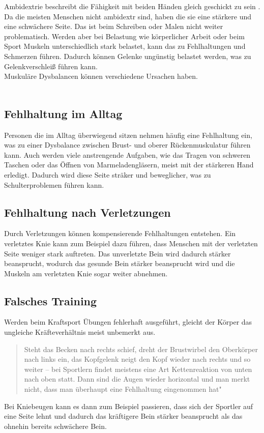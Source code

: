 
Ambidextrie beschreibt die Fähigkeit mit beiden Händen gleich geschickt zu sein \cite{wissen.de}. Da die meisten  Menschen nicht ambidextr sind, haben die sie eine stärkere und eine schwächere Seite. Das ist beim Schreiben oder Malen nicht weiter problematisch. Werden aber bei Belastung wie körperlicher Arbeit oder beim Sport Muskeln unterschiedlich stark belastet, kann das zu Fehlhaltungen und Schmerzen führen. Dadurch können Gelenke ungünstig belastet werden, was zu Gelenkverschleiß führen kann.\\
Muskuläre Dysbalancen können verschiedene Ursachen haben. \\
\\
 \subsection{Fehlhaltung im Alltag}
 Personen die im Alltag überwiegend sitzen nehmen häufig eine Fehlhaltung ein, was zu einer Dysbalance zwischen Brust- und oberer Rückenmuskulatur führen kann. Auch werden viele anstrengende Aufgaben, wie das Tragen von schweren Taschen oder das Öffnen von Marmeladengläsern, meist mit der stärkeren Hand erledigt. Dadurch wird diese Seite sträker und beweglicher, was zu Schulterproblemen führen kann.

 \subsection{Fehlhaltung nach Verletzungen}
 Durch Verletzungen können kompensierende Fehlhaltungen entstehen. Ein verletztes Knie kann zum Beispiel dazu führen, dass Menschen mit der verletzten Seite weniger stark auftreten. Das unverletzte Bein wird dadurch stärker beansprucht, wodurch das gesunde Bein stärker beansprucht wird und die Muskeln am verletzten Knie sogar weiter abnehmen.

 \subsection{Falsches Training}
Werden beim Kraftsport Übungen fehlerhaft ausgeführt, gleicht der Körper das ungleiche Kräfteverhältnis meist unbemerkt aus.

\begin{quote}
Steht das Becken nach rechts schief, dreht der Brustwirbel den Oberkörper nach links ein, das Kopfgelenk neigt den Kopf wieder nach rechts und so weiter – bei Sportlern findet meistens eine Art Kettenreaktion von unten nach oben statt. Dann sind die Augen wieder horizontal und man merkt nicht, dass man überhaupt eine Fehlhaltung eingenommen hat" \cite{MensHealth}
\end{quote}
Bei Kniebeugen kann es dann zum Beispiel passieren, dass sich der Sportler auf eine Seite lehnt und dadurch das kräftigere Bein stärker beansprucht als das ohnehin bereits schwächere Bein. \\
\\

